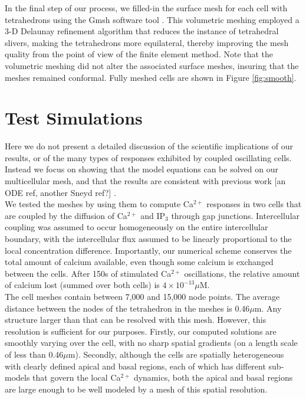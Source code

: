 \documentclass[a4paper,10pt]{article}
\begin{document}
In the final step of our process, we filled-in the surface mesh for each cell with tetrahedrons using the Gmsh software tool \cite{NME:NME2579}. This volumetric meshing employed a 3-D Delaunay refinement algorithm that reduces the instance of tetrahedral slivers, making the tetrahedrons more equilateral, thereby improving the mesh quality from the point of view of the finite element method. Note that the volumetric meshing did not alter the associated surface meshes, insuring that the meshes remained conformal. Fully meshed cells are shown in Figure \ref{fig:smooth}.\\

\section{Test Simulations}
Here we do not present a detailed discussion of the scientific implications of our results, or of the many types of responses exhibited by coupled oscillating cells. Instead we focus on showing that the model equations can be solved on our multicellular mesh, and that the results are consistent with previous work [an ODE ref, another Sneyd ref?] \cite{Sneyd2017383}.\\

We tested the meshes by using them to compute Ca$^{2+}$ responses in two cells that are coupled by the diffusion of Ca$^{2+}$ and IP$_3$ through gap junctions. Intercellular coupling was assumed to occur homogeneously on the entire intercellular boundary, with the intercellular flux assumed to be linearly proportional to the local concentration difference.
Importantly, our numerical scheme  conserves the total amount of calcium available, even though some calcium is exchanged between the cells. After 150s of stimulated Ca$^{2+}$ oscillations, the relative amount of calcium lost (summed over both cells) is $4\times10^{-13}\mu$M.\\

The cell meshes contain between 7,000 and 15,000 node points. The average distance between the nodes of the tetrahedron in the meshes is 0.46$\mu$m. Any structure larger than that can be resolved with this mesh. However, this resolution is sufficient for our purposes. Firstly, our computed solutions are smoothly varying over the cell, with no sharp spatial gradients (on a length scale of less than 0.46$\mu$m). Secondly, although the cells are spatially heterogeneous with clearly defined apical and basal regions, each of which has different sub-models that govern the local Ca$^{2+}$ dynamics, both the apical and basal regions are large enough to be well modeled by a mesh of this spatial resolution.​\\
\end{document}
